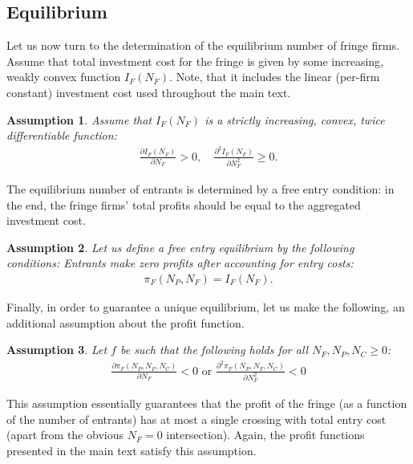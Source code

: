 \documentclass[a4paper]{article}
\newtheorem{assumption}{Assumption}
\begin{document}
\subsection{Equilibrium}
\label{sec:more_general_equilibrium}

Let us now turn to the determination of the equilibrium number of fringe firms.
Assume that total investment cost for the fringe is given by some increasing, weakly convex function $I_F(N_F)$.
Note, that it includes the linear (per-firm constant) investment cost used throughout the main text.
\begin{assumption}
    Assume that $I_F(N_F)$ is a strictly increasing, convex, twice differentiable function:
    \begin{align*}
        \frac{\partial I_F(N_F)}{\partial N_F} > 0, \quad \frac{\partial^2 I_F(N_F)}{\partial N_F^2} \geq 0.
    \end{align*}
\end{assumption}

The equilibrium number of entrants is determined by a free entry condition: in the end, the fringe firms' total profits should be equal to the aggregated investment cost.
\begin{assumption}
    \label{ass:free_entry}
    Let us define a free entry equilibrium by the following conditions: Entrants make zero profits after accounting for entry costs: 
    \begin{align*}
        \pi_F(N_P, N_F) = I_F(N_F).
    \end{align*}
\end{assumption}

Finally, in order to guarantee a unique equilibrium, let us make the following, an additional assumption about the profit function.
\begin{assumption}
    \label{ass:single_crossing}
    Let $f$ be such that the following holds for all $N_F, N_P, N_C \geq 0$:
    \begin{align*}
        \frac{\partial \pi_F(N_P, N_F, N_C)}{\partial N_F} < 0 \text{ or } \frac{\partial^2 \pi_F(N_P, N_F, N_C)}{\partial N_F^2} < 0
    \end{align*}
\end{assumption}
This assumption essentially guarantees that the profit of the fringe (as a function of the number of entrants) has at most a single crossing with total entry cost (apart from the obvious $N_F=0$ intersection).
Again, the profit functions presented in the main text satisfy this assumption.
\end{document}
